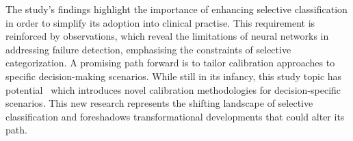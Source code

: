 The study's findings highlight the importance of enhancing selective classification in order to simplify its adoption into clinical practise. This requirement is reinforced by \cite{jaeger2022call} observations, which reveal the limitations of neural networks in addressing failure detection, emphasising the constraints of selective categorization. A promising path forward is to tailor calibration approaches to specific decision-making scenarios. While still in its infancy, this study topic has potential~\citep{zhao2021calibrating} which introduces novel calibration methodologies for decision-specific scenarios. This new research represents the shifting landscape of selective classification and foreshadows transformational developments that could alter its path.